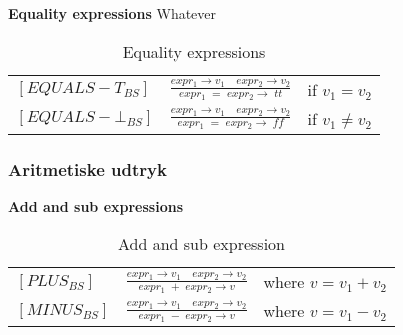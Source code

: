 \noindent \textbf{Equality expressions}
    Whatever
    
    


    \bgroup
    \def\arraystretch{3}
    \begin{table}[H]
    \centering
    \begin{tabular}{l c l}
        
        $[EQUALS-T_{BS}]$ &$\frac{expr_1 \rightarrow v_1 \quad expr_2 \rightarrow v_2}{expr_1\;=\;expr_2 \rightarrow \; tt}$ & if $v_1 = v_2$ \\
        
        $[EQUALS-\bot_{BS}]$ &$\frac{expr_1 \rightarrow v_1 \quad expr_2 \rightarrow v_2}{expr_1\;=\;expr_2 \rightarrow \; ff}$ & if $v_1 \ne v_2$ \\
        
    \end{tabular}
    \caption{Equality expressions}
    \label{tab:equaexpr}
    \end{table}
    \egroup

\noindent \subsubsection{Aritmetiske udtryk}

\noindent \textbf{Add and sub expressions}

    \bgroup
    \def\arraystretch{3}
    \begin{table}[H]
    \centering
    \begin{tabular}{l c l}
        
        $[PLUS_{BS}]$ &$\frac{expr_1 \rightarrow v_1 \quad expr_2 \rightarrow v_2}{expr_1\;+\;expr_2 \rightarrow v}$ & where $v = v_1 + v_2$ \\
        
        $[MINUS_{BS}]$ &$\frac{expr_1 \rightarrow v_1 \quad expr_2 \rightarrow v_2}{expr_1\;-\;expr_2 \rightarrow v}$ & where $v = v_1 - v_2$ \\
        
    \end{tabular}
    \caption{Add and sub expression}
    \label{tab:addandsub}
    \end{table}
    \egroup

    
    
  